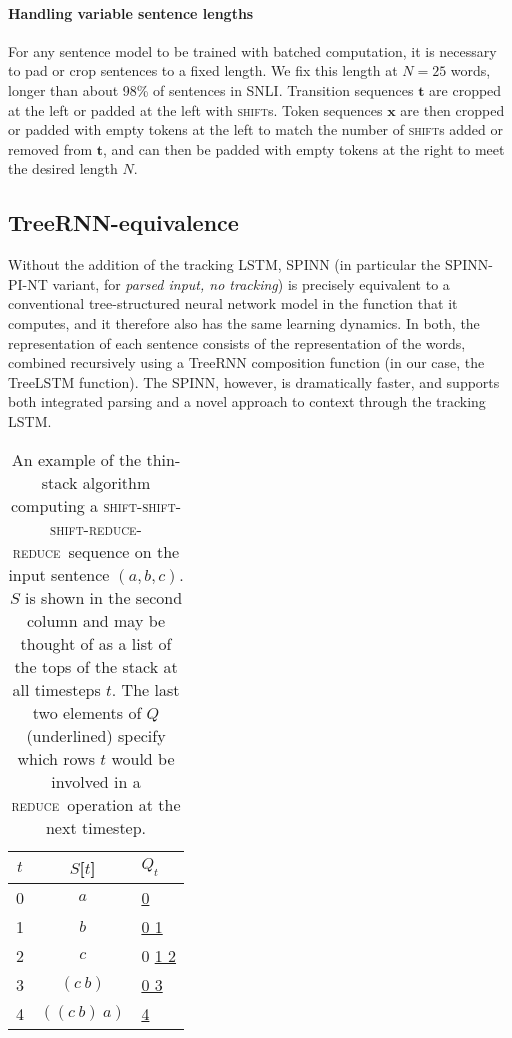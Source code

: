 \documentclass[11pt]{article}
\newcommand{\shift}{\textsc{shift}}
\newcommand{\reduce}{\textsc{reduce}}
\begin{document}
\paragraph{Handling variable sentence lengths} For any sentence model to be trained with batched computation, it is necessary to pad or crop sentences to a fixed length. We fix this length at $N = 25$ words, longer than about 98\% of sentences in SNLI. Transition sequences $\mathbf t$ are cropped at the left or padded at the left with \shift s. Token sequences $\mathbf x$ are then cropped or padded with empty tokens at the left to match the number of \shift s added or removed from $\mathbf t$, and can then be padded with empty tokens at the right to meet the desired length $N$.


\subsection{TreeRNN-equivalence}

Without the addition of the tracking LSTM, SPINN (in particular the SPINN-PI-NT variant, for \textit{parsed input, no tracking}) is precisely equivalent to a conventional tree-structured neural network model in the function that it computes, and it therefore also has the same learning dynamics. In both, the representation of each sentence consists of the representation of the words, combined recursively using a TreeRNN composition function (in our case, the TreeLSTM function). The SPINN, however, is dramatically faster, and supports both integrated parsing and a novel approach to context through the tracking LSTM.

\begin{table}[t]
\centering
\begin{tabular}{c|cl}
  \toprule
  $t$ & $S$[$t$] & $Q_t$ \\
  \midrule
  0 & $a$ & \underline{\hphantom{0} 0} \\
  1 & $b$ & \hphantom{0} \underline{0 1} \\
  2 & $c$ & \hphantom{0} 0 \underline{1 2} \\
  3 & $(c~b)$ & \hphantom{0} \underline{0 3} \\
  4 & $((c~b)~a)$ & \underline{\hphantom{0} 4} \\
  \bottomrule
\end{tabular}
\caption{An example of the thin-stack algorithm computing a \shift-\shift-\shift-\reduce-\reduce~sequence on the input sentence $(a, b, c)$. $S$ is shown in the second column and may be thought of as a list of the tops of the stack at all timesteps $t$. The last two elements of $Q$ (underlined) specify which rows $t$ would be involved in a \reduce~operation at the next timestep.}
\label{tbl:thin-stack}
\end{table}
\end{document}
